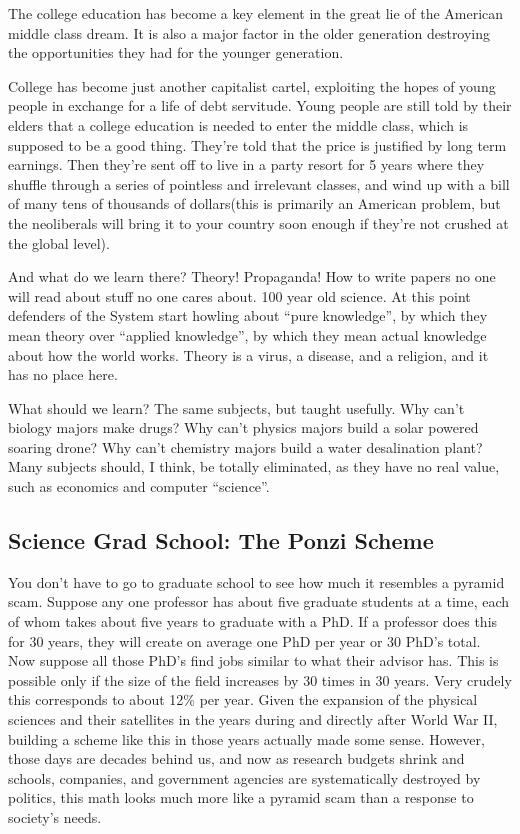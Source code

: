 The college education has become a key element in the great lie of the
American middle class dream. It is also a major factor in the older
generation destroying the opportunities they had for the younger
generation.

College has become just another capitalist cartel, exploiting the hopes
of young people in exchange for a life of debt servitude. Young people
are still told by their elders that a college education is needed to
enter the middle class, which is supposed to be a good thing. They're
told that the price is justified by long term earnings. Then they're
sent off to live in a party resort for 5 years where they shuffle
through a series of pointless and irrelevant classes, and wind up with a
bill of many tens of thousands of dollars(this is primarily an American
problem, but the neoliberals will bring it to your country soon enough
if they're not crushed at the global level).

And what do we learn there? Theory! Propaganda! How to write papers no
one will read about stuff no one cares about. 100 year old science. At
this point defenders of the System start howling about ``pure
knowledge'', by which they mean theory over ``applied knowledge'', by
which they mean actual knowledge about how the world works. Theory is a
virus, a disease, and a religion, and it has no place here.

What should we learn? The same subjects, but taught usefully. Why can't
biology majors make drugs? Why can't physics majors build a solar
powered soaring drone? Why can't chemistry majors build a water
desalination plant? Many subjects should, I think, be totally
eliminated, as they have no real value, such as economics and computer
``science''.

\subsection{Science Grad School: The Ponzi
Scheme}\label{science-grad-school-the-ponzi-scheme}

You don't have to go to graduate school to see how much it resembles a
pyramid scam. Suppose any one professor has about five graduate students
at a time, each of whom takes about five years to graduate with a PhD.
If a professor does this for 30 years, they will create on average one
PhD per year or 30 PhD's total. Now suppose all those PhD's find jobs
similar to what their advisor has. This is possible only if the size of
the field increases by 30 times in 30 years. Very crudely this
corresponds to about 12\% per year. Given the expansion of the physical
sciences and their satellites in the years during and directly after
World War II, building a scheme like this in those years actually made
some sense. However, those days are decades behind us, and now as
research budgets shrink and schools, companies, and government agencies
are systematically destroyed by politics, this math looks much more like
a pyramid scam than a response to society's needs.

